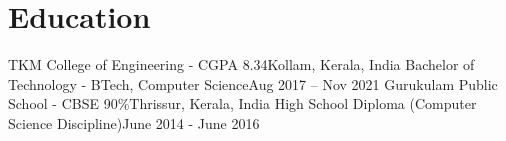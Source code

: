 \section{Education}
  \resumeSubHeadingListStart
    \resumeHeading
      {TKM College of Engineering - CGPA 8.34}{Kollam, Kerala, India}
      {Bachelor of Technology - BTech, Computer Science}{Aug 2017 -- Nov 2021}
    \resumeHeading
      {Gurukulam Public School - CBSE 90\%}{Thrissur, Kerala, India}
      {High School Diploma (Computer Science Discipline)}{June 2014 - June 2016}
  \resumeSubHeadingListEnd


